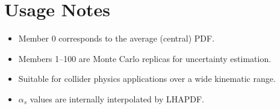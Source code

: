 \documentclass[a4paper,11pt]{article}
\begin{document}
\section*{Usage Notes}
\begin{itemize}
    \item Member 0 corresponds to the average (central) PDF.
    \item Members 1--100 are Monte Carlo replicas for uncertainty estimation.
    \item Suitable for collider physics applications over a wide kinematic range.
    \item $\alpha_s$ values are internally interpolated by LHAPDF.
\end{itemize}
\end{document}
